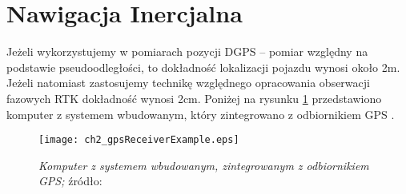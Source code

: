 \section{Nawigacja Inercjalna}
\noindent
Jeżeli wykorzystujemy w pomiarach pozycji DGPS – pomiar względny na podstawie pseudoodległości,
to dokładność lokalizacji pojazdu wynosi około 2m. 
Jeżeli natomiast zastosujemy technikę względnego opracowania obserwacji fazowych RTK dokładność wynosi 2cm.
Poniżej na rysunku \ref{fig:ch2_gpsReceiverExample} przedstawiono komputer z systemem wbudowanym,
który zintegrowano z odbiornikiem GPS \cite{CCTA_951_958}.
\begin{figure}[H]
\centering
\texttt{[image: ch2\_gpsReceiverExample.eps]}
\caption{\textit{Komputer z systemem wbudowanym, zintegrowanym z odbiornikiem GPS;} źródło: \cite[][strona 952]{CCTA_951_958}}
\label{fig:ch2_gpsReceiverExample}
\end{figure}
\noindent
